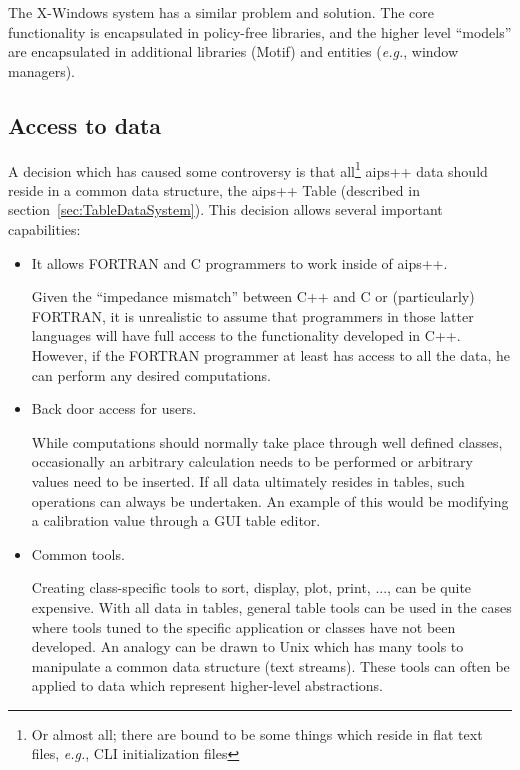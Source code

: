 The X-Windows system has a similar problem and solution. The core
functionality is encapsulated in policy-free libraries, and the higher
level ``models'' are encapsulated in additional libraries (Motif) and
entities ({\em e.g.}, window managers).
\subsection{Access to data}
\label{sec:access}

A decision which has caused some controversy is that all\footnote{Or
almost all; there are bound to be some things which reside in flat
text files, {\em e.g.}, CLI initialization files} {\sc aips++} data
should reside in a common data structure, the {\sc aips++} Table
(described in section~\ref{sec:TableDataSystem}). This decision allows
several important capabilities:

\begin{itemize}
\item It allows FORTRAN and C programmers to work inside of {\sc aips++}.

      Given the ``impedance mismatch'' between C++ and C or
      (particularly) FORTRAN, it is unrealistic to assume that
      programmers in those latter languages will have full access to
      the functionality developed in C++. However, if the FORTRAN
      programmer at least has access to all the data, he can perform
      any desired computations.

\item Back door access for users.

      While computations should normally take place through well
      defined classes, occasionally an arbitrary calculation needs to be
      performed or arbitrary values need to be inserted. If all data
      ultimately resides in tables, such operations can always
      be undertaken. An example of this would be modifying a
      calibration value through a GUI table editor.

\item Common tools.
 
      Creating class-specific tools to sort, display, plot, print, ..., 
      can be quite
      expensive. With all data in tables, general table tools can be
      used  in the cases where tools tuned to the specific application
      or classes have not been developed. An analogy can be drawn to
      Unix which has many tools to manipulate a common data structure
      (text streams). These tools can often be applied to data which
      represent higher-level abstractions.
\end{itemize}

